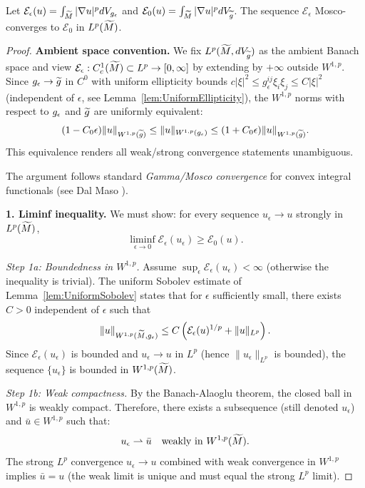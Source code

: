 \begin{theorem}\label{thm:MoscoConvergence}
Let $\mathcal{E}_\epsilon(u) = \int_{\widetilde{M}} |\nabla u|^p dV_{g_{\epsilon}}$ and $\mathcal{E}_0(u) = \int_{\widetilde{M}} |\nabla u|^p dV_{\widetilde{g}}$. The sequence $\mathcal{E}_\epsilon$ Mosco-converges to $\mathcal{E}_0$ in $L^p(\widetilde{M})$.
\end{theorem}
\begin{proof}
\textbf{Ambient space convention.} We fix $L^p(\widetilde{M}, dV_{\widetilde{g}})$ as the ambient Banach space and view $\mathcal{E}_\epsilon: C^1_c(\widetilde{M}) \subset L^p \to [0, \infty]$ by extending by $+\infty$ outside $W^{1,p}$. Since $g_{\epsilon} \to \widetilde{g}$ in $C^0$ with uniform ellipticity bounds $c|\xi|^2 \le g_\epsilon^{ij}\xi_i\xi_j \le C|\xi|^2$ (independent of $\epsilon$, see Lemma~\ref{lem:UniformEllipticity}), the $W^{1,p}$ norms with respect to $g_{\epsilon}$ and $\widetilde{g}$ are uniformly equivalent:
\begin{equation}\label{eq:NormEquivalence}
    (1 - C_0\epsilon) \|u\|_{W^{1,p}(\widetilde{g})} \le \|u\|_{W^{1,p}(g_{\epsilon})} \le (1 + C_0\epsilon) \|u\|_{W^{1,p}(\widetilde{g})}.
\end{equation}
This equivalence renders all weak/strong convergence statements unambiguous.

The argument follows standard \emph{Gamma/Mosco convergence} for convex integral functionals (see Dal Maso \cite{dalmaso1993}).

\textbf{1. Liminf inequality.}
We must show: for every sequence $u_\epsilon \to u$ strongly in $L^p(\widetilde{M})$,
\begin{equation}\label{eq:LiminfMosco}
    \liminf_{\epsilon \to 0} \mathcal{E}_\epsilon(u_\epsilon) \ge \mathcal{E}_0(u).
\end{equation}

\textit{Step 1a: Boundedness in $W^{1,p}$.}
Assume $\sup_\epsilon \mathcal{E}_\epsilon(u_\epsilon) < \infty$ (otherwise the inequality is trivial). The uniform Sobolev estimate of Lemma~\ref{lem:UniformSobolev} states that for $\epsilon$ sufficiently small, there exists $C > 0$ independent of $\epsilon$ such that
\[
    \|u\|_{W^{1,p}(\widetilde{M}, g_{\epsilon})} \le C \left( \mathcal{E}_\epsilon(u)^{1/p} + \|u\|_{L^p} \right).
\]
Since $\mathcal{E}_\epsilon(u_\epsilon)$ is bounded and $u_\epsilon \to u$ in $L^p$ (hence $\|u_\epsilon\|_{L^p}$ is bounded), the sequence $\{u_\epsilon\}$ is bounded in $W^{1,p}(\widetilde{M})$.

\textit{Step 1b: Weak compactness.}
By the Banach-Alaoglu theorem, the closed ball in $W^{1,p}$ is weakly compact. Therefore, there exists a subsequence (still denoted $u_\epsilon$) and $\bar{u} \in W^{1,p}$ such that:
\[
    u_\epsilon \rightharpoonup \bar{u} \quad \text{weakly in } W^{1,p}(\widetilde{M}).
\]
The strong $L^p$ convergence $u_\epsilon \to u$ combined with weak convergence in $W^{1,p}$ implies $\bar{u} = u$ (the weak limit is unique and must equal the strong $L^p$ limit).


\end{proof}
